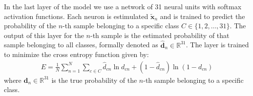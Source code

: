 \documentclass[a4paper]{article}
\begin{document}
In the last layer of the model we use a network of 31 neural units with softmax
activation functions. Each neuron is estimulated $\mathbf{\tilde{x}}_n$ and is
trained to predict the probability of the $n$-th sample belonging to a specific
class $C \in \{1, 2, \dots, 31\}$. The output of this layer for the $n$-th
sample is the estimated probability of that sample belonging to all classes, 
formally denoted as $\mathbf{\hat{d}}_n \in \mathbb{R}^{31}$. The layer is trained to minimize
the cross entropy function \cite{szegedy2016rethinking} given by:
\begin{align}
E=\frac{1}{N} \sum_{n=1}^N \sum_{c \in C} \hat{d}_{cn} \ln d_{cn} + (1 -
\hat{d}_{cn}) \ln (1 - d_{cn}) 
\label{eq:entropy}
\end{align}
where $\mathbf{d}_n \in \mathbb{R}^{31}$ is the true probability of the $n$-th
sample belonging to a specific class. 
\end{document}
